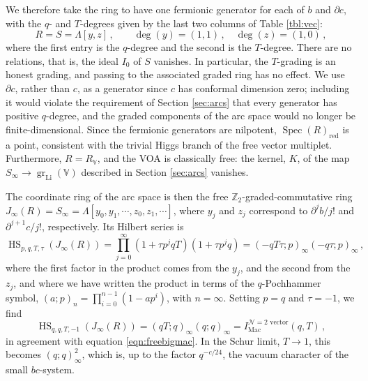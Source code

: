 \documentclass[12pt]{article}
\numberwithin{equation}{section}
\numberwithin{figure}{section}
\theoremstyle{plain}
\theoremstyle{definition}
\begin{document}
We therefore take the ring to have one fermionic generator for each of $b$ and $\partial c$, with the $q$- and $T$-degrees given by the last two columns of Table \ref{tbl:vec}:
\begin{equation}
    R = S = \Lambda[y, z] \,, \qquad \operatorname{deg}(y) = (1, 1) \,, \quad \operatorname{deg}(z) = (1, 0) \,,
\end{equation}
where the first entry is the $q$-degree and the second is the $T$-degree. There are no relations, that is, the ideal $I_0$ of $S$ vanishes. In particular, the $T$-grading is an honest grading, and passing to the associated graded ring has no effect. We use $\partial c$, rather than $c$, as a generator since $c$ has conformal dimension zero; including it would violate the requirement of Section \ref{sec:arcs} that every generator has positive $q$-degree, and the graded components of the arc space would no longer be finite-dimensional. Since the fermionic generators are nilpotent, $\operatorname{Spec}(R)_\text{red}$ is a point, consistent with the trivial Higgs branch of the free vector multiplet. Furthermore, $R = R_\mathbb{V}$, and the VOA is classically free: the kernel, $K$, of the map $S_\infty \rightarrow \operatorname{gr}_{\operatorname{Li}}(\mathbb{V})$ described in Section \ref{sec:arcs} vanishes.

The coordinate ring of the arc space is then the free $\mathbb{Z}_2$-graded-commutative ring $J_\infty(R) = S_\infty = \Lambda[y_0, y_1, \cdots, z_0, z_1, \cdots]$, where $y_j$ and $z_j$ correspond to $\partial^j b / j!$ and $\partial^{j+1} c / j!$, respectively. Its Hilbert series is
\begin{equation}
    \operatorname{HS}_{p,q,T,\tau}(J_\infty(R)) = \prod_{j = 0}^\infty (1 + \tau p^j q T)(1 + \tau p^j q) = (-qT\tau; p)_\infty (-q\tau; p)_\infty \,,
\end{equation}
where the first factor in the product comes from the $y_j$, and the second from the $z_j$, and where we have written the product in terms of the $q$-Pochhammer symbol, $(a; p)_n = \prod_{i=0}^{n-1} (1 - a p^i)$, with $n = \infty$. Setting $p = q$ and $\tau = -1$, we find
\begin{equation}
    \operatorname{HS}_{q,q,T,-1}(J_\infty(R)) = (qT; q)_\infty (q; q)_\infty = I_\text{Mac}^{\mathcal{N}=2\text{ vector}}(q, T) \,,
\end{equation}
in agreement with equation \eqref{eqn:freebigmac}. In the Schur limit, $T \rightarrow 1$, this becomes $(q; q)_\infty^2$, which is, up to the factor $q^{-c/24}$, the vacuum character of the small $bc$-system.
\end{document}
